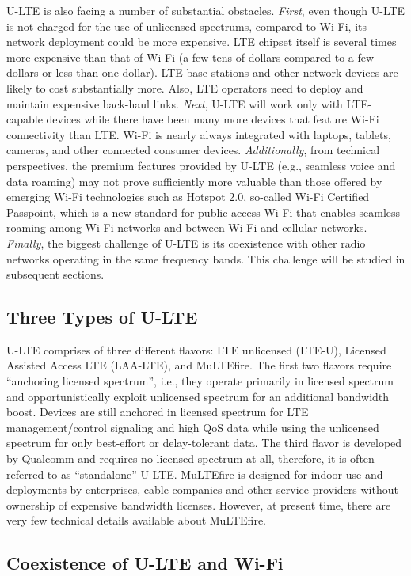\documentclass[journal,draftclsnofoot,12pt,onecolumn]{IEEEtran}
\begin{document}
U-LTE is also facing a number of substantial obstacles. \textit{First}, even though U-LTE is not charged for the use of unlicensed spectrums, compared to Wi-Fi, its network deployment could be more expensive. LTE chipset itself is several times more expensive than that of Wi-Fi (a few tens of dollars compared to a few dollars or less than one dollar). LTE base stations and other network devices are likely to cost substantially more. Also, LTE operators need to deploy and maintain expensive back-haul links. \textit{Next}, U-LTE will work only with LTE-capable devices while there have been many more devices that feature Wi-Fi connectivity than LTE. Wi-Fi is nearly always integrated with laptops, tablets, cameras, and other connected consumer devices. \textit{Additionally}, from technical perspectives, the premium features provided by U-LTE (e.g., seamless voice and data roaming) may not prove sufficiently more valuable than those offered by emerging Wi-Fi technologies such as Hotspot 2.0, so-called Wi-Fi Certified Passpoint, which is a new standard for public-access Wi-Fi that enables seamless roaming among Wi-Fi networks and between Wi-Fi and cellular networks. \textit{Finally}, the biggest challenge of U-LTE is its coexistence with other radio networks operating in the same frequency bands. This challenge will be studied in subsequent sections. 

\subsection{Three Types of U-LTE}

\noindent U-LTE comprises of three different flavors: LTE unlicensed (LTE-U), Licensed Assisted Access LTE (LAA-LTE), and MuLTEfire. The first two flavors require ``anchoring licensed spectrum'', i.e., they operate primarily in licensed spectrum and opportunistically exploit unlicensed spectrum for an additional bandwidth boost. Devices are still anchored in licensed spectrum for LTE management/control signaling and high QoS data while using the unlicensed spectrum for only best-effort or delay-tolerant data. The third flavor is developed by Qualcomm and requires no licensed spectrum at all, therefore, it is often referred to as ``standalone'' U-LTE. MuLTEfire is designed for indoor use and deployments by enterprises, cable companies and other service providers without ownership of expensive bandwidth licenses. However, at present time, there are very few technical details available about MuLTEfire.

\subsection{Coexistence of U-LTE and Wi-Fi}
\end{document}
